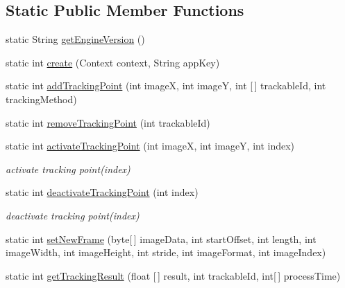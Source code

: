 \subsection*{Static Public Member Functions}
\begin{DoxyCompactItemize}
\item 
static String \hyperlink{classcom_1_1maxst_1_1vidchaser_1_1_vid_chaser_a_p_i_a0a384a71903aca04dad7ae5a7b641da9}{get\+Engine\+Version} ()
\item 
static int \hyperlink{classcom_1_1maxst_1_1vidchaser_1_1_vid_chaser_a_p_i_aa9a6cbc276431f56d11509c22c640749}{create} (Context context, String app\+Key)
\item 
static int \hyperlink{classcom_1_1maxst_1_1vidchaser_1_1_vid_chaser_a_p_i_a39767b1ffd8a00d529d3183a00dd45b3}{add\+Tracking\+Point} (int imageX, int imageY, int \mbox{[}$\,$\mbox{]} trackable\+Id, int tracking\+Method)
\item 
static int \hyperlink{classcom_1_1maxst_1_1vidchaser_1_1_vid_chaser_a_p_i_a52b3b148426377d86b7e3985ca4625fe}{remove\+Tracking\+Point} (int trackable\+Id)
\item 
static int \hyperlink{classcom_1_1maxst_1_1vidchaser_1_1_vid_chaser_a_p_i_a70d462cf63aa4c014a0cc42f3af9f3d4}{activate\+Tracking\+Point} (int imageX, int imageY, int index)
\begin{DoxyCompactList}\small\item\em activate tracking point(index) \end{DoxyCompactList}\item 
static int \hyperlink{classcom_1_1maxst_1_1vidchaser_1_1_vid_chaser_a_p_i_a36952cb46625a4a4ee0fa7183fbf03b1}{deactivate\+Tracking\+Point} (int index)
\begin{DoxyCompactList}\small\item\em deactivate tracking point(index) \end{DoxyCompactList}\item 
static int \hyperlink{classcom_1_1maxst_1_1vidchaser_1_1_vid_chaser_a_p_i_af391e17e712749adbb5bfee2b762d941}{set\+New\+Frame} (byte\mbox{[}$\,$\mbox{]} image\+Data, int start\+Offset, int length, int image\+Width, int image\+Height, int stride, int image\+Format, int image\+Index)
\item 
static int \hyperlink{classcom_1_1maxst_1_1vidchaser_1_1_vid_chaser_a_p_i_aa7555cd0125d9d7e3c2d3eae519ce1b0}{get\+Tracking\+Result} (float \mbox{[}$\,$\mbox{]} result, int trackable\+Id, int\mbox{[}$\,$\mbox{]} process\+Time)
\item 

\end{DoxyCompactItemize}
